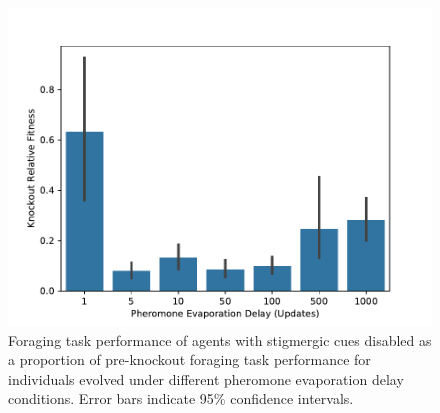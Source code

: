 \begin{figure}[!htbp]
\begin{center}
\includegraphics[width=\textwidth]{img/knockout_rel_fit_stig_delay.pdf}
\caption{
Foraging task performance of agents with stigmergic cues disabled as a proportion of pre-knockout foraging task performance for individuals evolved under different pheromone evaporation delay conditions.
Error bars indicate 95\% confidence intervals.
}
\label{fig:knockout_rel_fit_stig_delay}
\end{center}
\end{figure}
